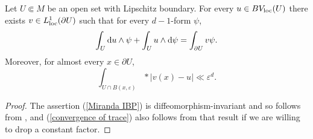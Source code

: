 \begin{proposition}\label{traces}
Let $U \Subset M$ be an open set with Lipschitz boundary.
For every $u \in BV_{\mathrm{loc}}(U)$ there exists $v \in L^1_{\mathrm{loc}}(\partial U)$ such that for every $d-1$-form $\psi$,
\begin{equation}\label{Miranda IBP}
\int_U \mathop{}\!\mathrm{d} u \wedge \psi + \int_U u \wedge \mathop{}\!\mathrm{d} \psi = \int_{\partial U} v\psi.
\end{equation}
Moreover, for almost every $x \in \partial U$,
\begin{equation}\label{convergence of trace}
\int_{U \cap B(x, \varepsilon)} *|v(x) - u| \ll \varepsilon^d.
\end{equation}
\end{proposition}
\begin{proof}
The assertion (\ref{Miranda IBP}) is diffeomorphism-invariant and so follows from \cite[Teorema 1]{Miranda67}, and (\ref{convergence of trace}) also follows from that result if we are willing to drop a constant factor.
%
%
\end{proof}

